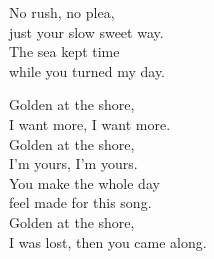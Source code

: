 \begin{lyrics}
No rush, no plea,\\
just your slow sweet way.\\
The sea kept time\\
while you turned my day.

Golden at the shore,\\
I want more, I want more.\\
Golden at the shore,\\
I’m yours, I’m yours.\\
You make the whole day\\
feel made for this song.\\
Golden at the shore,\\
I was lost, then you came along.
\end{lyrics}

